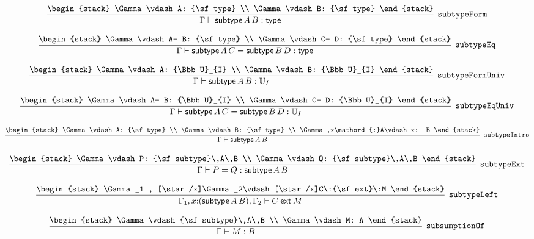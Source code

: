\[
\infer[{\tt subtypeForm}]{\Gamma \vdash {\sf subtype}\,A\,B: {\sf type}}{
\begin{stack}
\Gamma \vdash A: {\sf type}
\\
\Gamma \vdash B: {\sf type}
\end{stack}}
\]

\[
\infer[{\tt subtypeEq}]{\Gamma \vdash {\sf subtype}\,A\,C= {\sf subtype}\,B\,D: {\sf type}}{
\begin{stack}
\Gamma \vdash A= B: {\sf type}
\\
\Gamma \vdash C= D: {\sf type}
\end{stack}}
\]

\[
\infer[{\tt subtypeFormUniv}]{\Gamma \vdash {\sf subtype}\,A\,B: {\Bbb U}_{I}}{
\begin{stack}
\Gamma \vdash A: {\Bbb U}_{I}
\\
\Gamma \vdash B: {\Bbb U}_{I}
\end{stack}}
\]

\[
\infer[{\tt subtypeEqUniv}]{\Gamma \vdash {\sf subtype}\,A\,C= {\sf subtype}\,B\,D: {\Bbb U}_{I}}{
\begin{stack}
\Gamma \vdash A= B: {\Bbb U}_{I}
\\
\Gamma \vdash C= D: {\Bbb U}_{I}
\end{stack}}
\]

\[
\infer[{\tt subtypeIntro}]{\Gamma \vdash {\sf subtype}\,A\,B}{
\begin{stack}
\Gamma \vdash A: {\sf type}
\\
\Gamma \vdash B: {\sf type}
\\
\Gamma ,x\mathord{:}A\vdash x: B
\end{stack}}
\]

\[
\infer[{\tt subtypeExt}]{\Gamma \vdash P= Q: {\sf subtype}\,A\,B}{
\begin{stack}
\Gamma \vdash P: {\sf subtype}\,A\,B
\\
\Gamma \vdash Q: {\sf subtype}\,A\,B
\end{stack}}
\]

\[
\infer[{\tt subtypeLeft}]{\Gamma_1 ,x\mathord{:}({\sf subtype}\,A\,B), \Gamma_2 \vdash C\:{\sf ext}\:M}{
\begin{stack}
\Gamma_1 , [\star /x]\Gamma_2\vdash [\star /x]C\:{\sf ext}\:M
\end{stack}}
\]

\[
\infer[{\tt subsumptionOf}]{\Gamma \vdash M: B}{
\begin{stack}
\Gamma \vdash {\sf subtype}\,A\,B
\\
\Gamma \vdash M: A
\end{stack}}
\]

